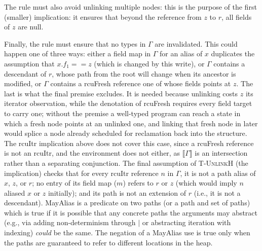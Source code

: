The rule must also avoid unlinking multiple nodes: this is the purpose of the first (smaller) implication: it ensures that beyond the reference from $z$ to $r$, all fields of $z$ are null.

Finally, the rule must ensure that no types in $\Gamma$ are invalidated.  This could happen one of three ways: either a field map in $\Gamma$ for an alias of $x$ duplicates the assumption that $x.f_1==z$ (which is changed by this write), or $\Gamma$ contains a descendant of $r$, whose path from the root will change when its ancestor is modified, or $\Gamma$ contains a \textsf{rcuFresh} reference one of whose fields points at $z$.  The last is what the final premise excludes.  It is needed because unlinking costs $z$ its \textsf{iterator} observation, while the denotation of \textsf{rcuFresh} requires every field target to carry one; without the premise a well-typed program can reach a state in which a fresh node points at an unlinked one, and linking that fresh node in later would splice a node already scheduled for reclamation back into the structure.  The \textsf{rcuItr} implication above does not cover this case, since a \textsf{rcuFresh} reference is not an \textsf{rcuItr}, and the environment does not either, as $\llbracket \Gamma \rrbracket$ is an intersection rather than a separating conjunction.
The final assumption of \textsc{T-UnlinkH} (the implication)
checks that for every \textsf{rcuItr} reference $n$ in $\Gamma$, it is not a path alias of $x$, $z$, or $r$; no entry of its field map ($m$) refers to $r$ or $z$ (which would imply $n$ aliased $x$ or $z$ initially); and its path is not an extension of $r$ (i.e., it is not a descendant). \textsf{MayAlias} is a predicate on two paths (or a path and set of paths) which is true if it is possible that any concrete paths the arguments may abstract (e.g., via adding non-determinism through $|$ or abstracting iteration with indexing) \emph{could} be the same.  The negation of a \textsf{MayAlias} use is true only when the paths are guaranteed to refer to different locations in the heap.

